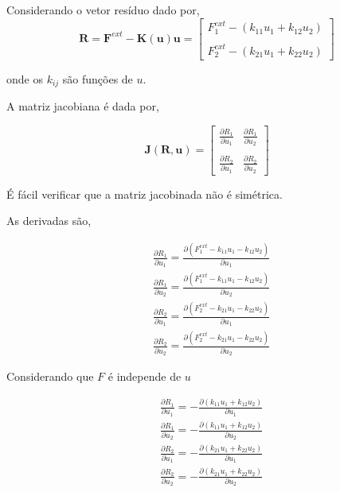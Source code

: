 \documentclass[12pt,a4paper]{article}
\begin{document}
\noindent
Considerando o vetor resíduo dado por,
\begin{equation}
\mathbf{R} = \mathbf{F}^{ext} - \mathbf{K}(\mathbf{u})\mathbf{u} =
\begin{bmatrix}
F^{ext}_1 - (k_{11}u_1 + k_{12}u_2)\\ 
\\
F^{ext}_2 - (k_{21}u_1 + k_{22}u_2) 
\end{bmatrix}
\end{equation}

\noindent
onde os $k_{ij}$ são funções de $u$. 

A matriz jacobiana é dada por,

\begin{equation}
\mathbf{J}(\mathbf{R}, \mathbf{u}) = 
\begin{bmatrix}
\frac{\partial R_1}{\partial u_1}& \frac{\partial R_1}{\partial u_2}\\ 
\\
\frac{\partial R_2}{\partial u_1}& \frac{\partial R_2}{\partial u_2} 
\end{bmatrix}
\end{equation}

\noindent
É fácil verificar que a matriz jacobinada não é simétrica.

As derivadas são,

\begin{align}
&\frac{\partial R_1}{\partial u_1} = \frac{\partial (F^{ext}_1 - k_{11} u_1 - k_{12} u_2)}{\partial u_1}\\ 
&\frac{\partial R_1}{\partial u_2} = \frac{\partial (F^{ext}_1 - k_{11} u_1 - k_{12} u_2)}{\partial u_2}\\ 
&\frac{\partial R_2}{\partial u_1} = \frac{\partial (F^{ext}_2 - k_{21} u_1 - k_{22} u_2)}{\partial u_1}\\  
&\frac{\partial R_2}{\partial u_2} = \frac{\partial (F^{ext}_2 - k_{21} u_1 - k_{22} u_2)}{\partial u_2} 
\end{align}

Considerando que $F$ é independe de $u$

\begin{align}
&\frac{\partial R_1}{\partial u_1} = -\frac{\partial (k_{11} u_1 + k_{12} u_2)}{\partial u_1}\\ 
&\frac{\partial R_1}{\partial u_2} = -\frac{\partial (k_{11} u_1 + k_{12} u_2)}{\partial u_2}\\ 
&\frac{\partial R_2}{\partial u_1} = -\frac{\partial (k_{21} u_1 + k_{22} u_2)}{\partial u_1}\\  
&\frac{\partial R_2}{\partial u_2} = -\frac{\partial (k_{21} u_1 + k_{22} u_2)}{\partial u_2} 
\end{align}
\end{document}
